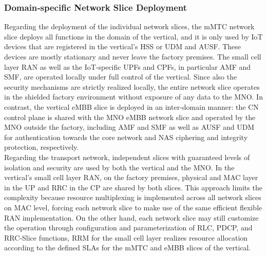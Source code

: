\documentclass[a4paper,12pt]{report} %
\begin{document}
\subsubsection{Domain‐specific Network Slice Deployment}
Regarding the deployment of the individual network slices, the mMTC network slice deploys all functions in the domain of the vertical, and it is only used by IoT
devices that are registered in the vertical’s \gls{HSS} or \gls{UDM} and \gls{AUSF}. These devices are mostly stationary and never
leave the factory premises. The small cell layer RAN as well as the IoT‐specific \gls{UPF}s and \gls{CPF}s, in particular \gls{AMF} and \gls{SMF}, are operated locally under full control of
the vertical. Since also the security mechanisms are strictly realized locally, the entire network slice operates in the shielded factory environment without exposure of any data to the MNO. In contrast, the vertical eMBB slice is deployed
in an inter‐domain manner: the CN control plane is shared with the MNO
eMBB network slice and operated by the MNO outside the factory, including AMF and SMF as well
as AUSF and \gls{UDM} for authentication towards the core network and \gls{NAS}
ciphering and integrity protection, respectively. \\
Regarding the transport network, independent slices
with guaranteed levels of isolation and security are used by both the vertical and the MNO. In the vertical’s small cell layer RAN, on the factory premises, physical and MAC layer in the UP
and \gls{RRC} in the CP are shared by both slices. This approach limits the complexity because resource
multiplexing is implemented across all network slices on MAC level, forcing each network slice to
make use of the same efficient flexible RAN implementation. On the other hand, each network slice
may still customize the operation through configuration and parameterization of \gls{RLC}, \gls{PDCP}, and RRC‐Slice functions, RRM for the small cell layer realizes resource allocation
according to the defined SLAs for the mMTC and eMBB slices of the vertical.
\end{document}
